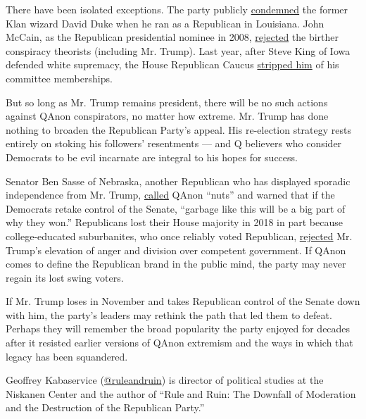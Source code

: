 There have been isolated exceptions. The party publicly
\href{https://www.nola.com/opinions/article_b617359d-6f5c-5398-9fbb-e3cef749755d.html}{condemned}
the former Klan wizard David Duke when he ran as a Republican in
Louisiana. John McCain, as the Republican presidential nominee in 2008,
\href{https://www.vox.com/policy-and-politics/2018/8/25/17782572/john-mccain-barack-obama-statement-2008-video}{rejected}
the birther conspiracy theorists (including Mr. Trump). Last year, after
Steve King of Iowa defended white supremacy, the House Republican Caucus
\href{https://www.vox.com/policy-and-politics/2019/1/14/18182956/steve-king-racist-gop-committee-removed}{stripped
him} of his committee memberships.

But so long as Mr. Trump remains president, there will be no such
actions against QAnon conspirators, no matter how extreme. Mr. Trump has
done nothing to broaden the Republican Party's appeal. His re-election
strategy rests entirely on stoking his followers' resentments --- and Q
believers who consider Democrats to be evil incarnate are integral to
his hopes for success.

Senator Ben Sasse of Nebraska, another Republican who has displayed
sporadic independence from Mr. Trump,
\href{https://www.axios.com/ben-sasse-qanon-trump-conspiracy-republican-1c6fe049-f934-465f-91c5-a8c48f802357.html}{called}
QAnon ``nuts'' and warned that if the Democrats retake control of the
Senate, ``garbage like this will be a big part of why they won.''
Republicans lost their House majority in 2018 in part because
college-educated suburbanites, who once reliably voted Republican,
\href{https://www.usatoday.com/story/news/politics/elections/2018/11/08/midterms-suburbs-republicans-democrats-trump/1921590002/}{rejected}
Mr. Trump's elevation of anger and division over competent government.
If QAnon comes to define the Republican brand in the public mind, the
party may never regain its lost swing voters.

If Mr. Trump loses in November and takes Republican control of the
Senate down with him, the party's leaders may rethink the path that led
them to defeat. Perhaps they will remember the broad popularity the
party enjoyed for decades after it resisted earlier versions of QAnon
extremism and the ways in which that legacy has been squandered.

Geoffrey Kabaservice
(\href{https://twitter.com/RuleandRuin?ref_src=twsrc\%5Egoogle\%7Ctwcamp\%5Eserp\%7Ctwgr\%5Eauthor}{@ruleandruin})
is director of political studies at the Niskanen Center and the author
of ``Rule and Ruin: The Downfall of Moderation and the Destruction of
the Republican Party.''

